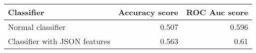 \begin{tabular}{lrr}
\toprule
 Classifier                    &   Accuracy score &   ROC Auc score \\
\midrule
 Normal classifier             &            0.507 &           0.596 \\
 Classifier with JSON features &            0.563 &           0.61  \\
\bottomrule
\end{tabular}